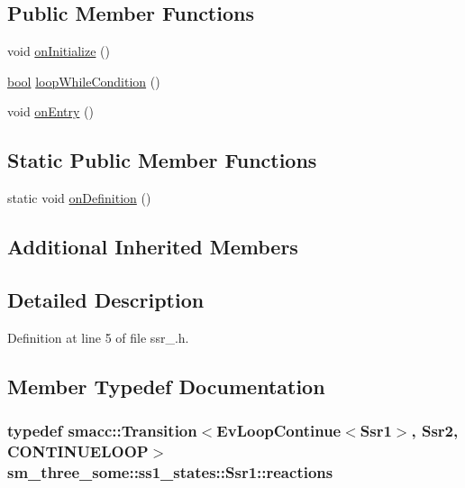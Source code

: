 \subsection*{Public Member Functions}
\begin{DoxyCompactItemize}
\item 
void \hyperlink{structsm__three__some_1_1ss1__states_1_1Ssr1_a8cdf7026b15fef41962e7726ad5d3c8b}{on\+Initialize} ()
\item 
\hyperlink{classbool}{bool} \hyperlink{structsm__three__some_1_1ss1__states_1_1Ssr1_a3bb61da3b273931fb05461242f0c9aed}{loop\+While\+Condition} ()
\item 
void \hyperlink{structsm__three__some_1_1ss1__states_1_1Ssr1_a5e8b5d1cbd96f419052a58d069f4737e}{on\+Entry} ()
\end{DoxyCompactItemize}
\subsection*{Static Public Member Functions}
\begin{DoxyCompactItemize}
\item 
static void \hyperlink{structsm__three__some_1_1ss1__states_1_1Ssr1_acdb4a482de2222ab4f68072faaaa43e8}{on\+Definition} ()
\end{DoxyCompactItemize}
\subsection*{Additional Inherited Members}


\subsection{Detailed Description}


Definition at line 5 of file ssr\+\_.\+h.



\subsection{Member Typedef Documentation}
\subsubsection[{\texorpdfstring{reactions}{reactions}}]{\setlength{\rightskip}{0pt plus 5cm}typedef {\bf smacc\+::\+Transition}$<$Ev\+Loop\+Continue$<${\bf Ssr1}$>$, {\bf Ssr2}, C\+O\+N\+T\+I\+N\+U\+E\+L\+O\+OP$>$ {\bf sm\+\_\+three\+\_\+some\+::ss1\+\_\+states\+::\+Ssr1\+::reactions}}\hypertarget{structsm__three__some_1_1ss1__states_1_1Ssr1_a1585ded2cbbefc1883cef0ef4360ebb6}{}\label{structsm__three__some_1_1ss1__states_1_1Ssr1_a1585ded2cbbefc1883cef0ef4360ebb6}


